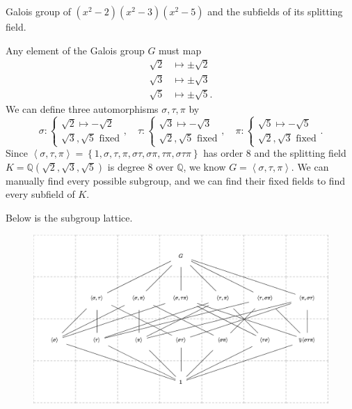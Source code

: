 \documentclass[10pt]{report}
\begin{document}
\begin{exer}[DF 14.2: 3]
	Galois group of $(x^2-2)(x^2-3)(x^2-5)$ and the subfields of its splitting field.
\end{exer}
Any element of the Galois group $G$ must map
\begin{align*}
	\sqrt{2} &\mapsto \pm \sqrt{2} \\
	\sqrt{3} &\mapsto \pm \sqrt{3} \\
	\sqrt{5} &\mapsto \pm \sqrt{5}.
\end{align*}
We can define three automorphisms $\sigma,\tau,\pi$ by
\[
\sigma:
\begin{cases}
	\sqrt{2} \mapsto -\sqrt{2} \\
	\sqrt{3} ,\sqrt{5} \text{ fixed}
\end{cases}, \quad
\tau:
\begin{cases}
        \sqrt{3} \mapsto -\sqrt{3} \\
        \sqrt{2} ,\sqrt{5} \text{ fixed}
\end{cases}, \quad
\pi:
\begin{cases}
        \sqrt{5} \mapsto -\sqrt{5} \\
        \sqrt{2} ,\sqrt{3} \text{ fixed}
\end{cases}.
\] Since $\left\langle \sigma,\tau,\pi \right\rangle = \left\{ 1, \sigma, \tau, \pi, \sigma\tau, \sigma \pi, \tau \pi, \sigma\tau \pi \right\}$ has order 8 and the splitting field $K=\mathbb{Q}(\sqrt{2} ,\sqrt{3} ,\sqrt{5} )$ is degree 8 over $\mathbb{Q}$, we know $G = \left\langle \sigma,\tau,\pi \right\rangle$. We can manually find every possible subgroup, and we can find their fixed fields to find every subfield of $K$.

Below is the subgroup lattice.
\begin{figure}[H]
	\centering
	\includegraphics[scale=0.3]{fig/grp}
\end{figure}
\end{document}
